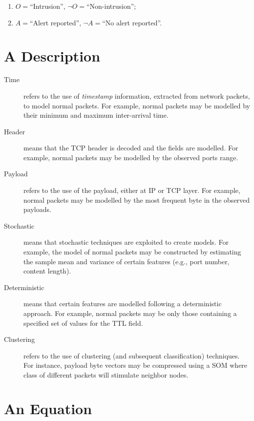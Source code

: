 \begin{enumerate}
\item $O = $``Intrusion'', $\neg O =$``Non-intrusion'';
\item $A = $``Alert reported'', $\neg A =$``No alert reported''.
\end{enumerate}


\section{A Description}

\begin{description}
\item[Time] refers to the use of \emph{timestamp} information, extracted from network packets, to model normal packets. For example, normal packets may be modelled by their minimum and maximum inter-arrival time.
\item[Header] means that the \ac{TCP} header is decoded and the fields are modelled. For example, normal packets may be modelled by the observed ports range.
\item[Payload] refers to the use of the payload, either at
\ac{IP} or \ac{TCP} layer. For example, normal packets may be modelled by the most frequent byte in the observed payloads.
\item[Stochastic] means that stochastic techniques are exploited to create models. For example, the model of normal packets may be constructed by estimating the sample mean and variance of certain features (e.g., port number, content length).
\item[Deterministic] means that certain features are modelled following a deterministic approach. For example, normal packets may be only those containing a specified set of values for the \ac{TTL} field.
\item[Clustering] refers to the use of clustering (and subsequent classification) techniques. For instance, payload byte vectors may be compressed using a \ac{SOM} where class of different packets will stimulate neighbor nodes.
\end{description}


\section{An Equation}

